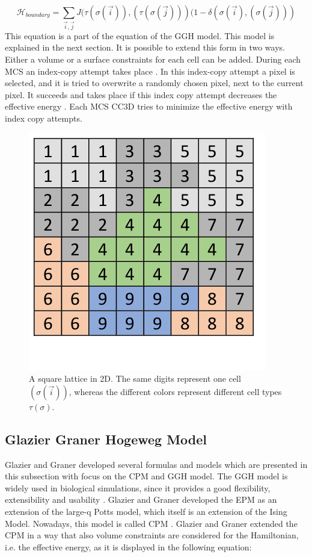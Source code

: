 \begin{equation}
\mathcal{H}_{boundary} = \sum_{\vec{i},\vec{j}}^{ }{J(\tau(\sigma(\vec{i})),(\tau(\sigma(\vec{j})))(1-\delta(\sigma(\vec{i}),(\sigma(\vec{j})))}
\end{equation}
This equation is a part of the equation of the \ac{GGH} model. This model is explained in the next section. It is possible to extend this form in two ways. Either a volume or a surface constraints for each cell can be added. 
During each \ac{MCS} an index-copy attempt takes place \cite{MaciejH.Swat2017}. In this index-copy attempt a pixel is selected, and it is tried to overwrite a randomly chosen pixel, next to the current pixel. It succeeds and takes place if this index copy attempt decreases the effective energy \cite{MaciejH.Swat2017}. Each \ac{MCS} \ac{CC3D} tries to minimize the effective energy with index copy attempts. 

\begin{figure}[th]
	\center
	\includegraphics[scale=0.4]{figures/2DSquareLattice.png}
	\caption[A two dimensional square lattice]{A square lattice in 2D. The same digits represent one cell $(\sigma(\vec{i}))$, whereas the different colors represent different cell types $\tau(\sigma)$.}
	\label{img:2DSquareLattice}
\end{figure}

\subsection{Glazier Graner Hogeweg Model} \label{subsec:Intro_GGH}
Glazier and Graner developed several formulas and models which are presented in this subsection with focus on the \ac{CPM} and \ac{GGH} model.\newline
The \ac{GGH} model is widely used in biological simulations, since it provides a good flexibility, extensibility and usability \cite{Glazier2007}. 
Glazier and Graner \cite{Glazier2007} developed the \ac{EPM} as an extension of the large-q Potts model, which itself is an extension of the Ising Model. Nowadays, this model is called \ac{CPM} \cite{Glazier2007, Graner1992, Glazier1993}. Glazier and Graner extended the \ac{CPM} in a way that also volume constraints are considered for the Hamiltonian, i.e. the effective energy, as it is displayed in the following equation:

